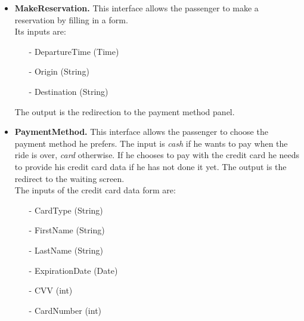 \begin{itemize}
		\item \textbf{MakeReservation.}
		This interface allows the passenger to make a reservation by filling in a form.\\ Its inputs are:
		\begin{itemize} 
			\item[-] DepartureTime (Time)
			\item[-] Origin (String)
			\item[-] Destination (String)
		\end{itemize}
		The output is the redirection to the payment method panel.
		\item \textbf{PaymentMethod.}
		This interface allows the passenger to choose the payment method he prefers. The input is \textit{cash} if he wants to pay when the ride is over, \textit{card} otherwise. If he chooses to pay with the credit card he needs to provide his credit card data if he has not done it yet. The output is the redirect to the waiting screen.\\ The inputs of the credit card data form are: 
		\begin{itemize} 
			\item[-] CardType (String)
			\item[-] FirstName (String)
			\item[-] LastName (String)
			\item[-] ExpirationDate (Date)
			\item[-] CVV (int)
			\item[-] CardNumber (int)
		\end{itemize}
	\end{itemize}
	\newpage
